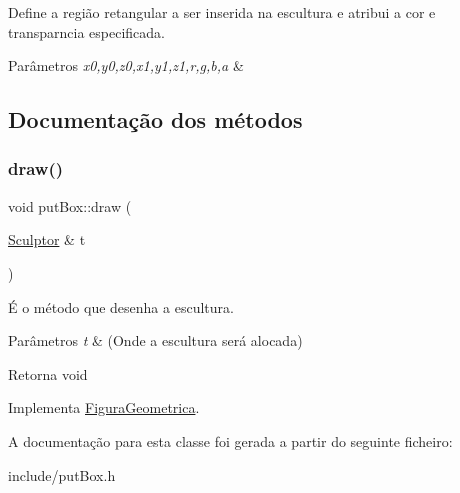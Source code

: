 Define a região retangular a ser inserida na escultura e atribui a cor e transparncia especificada. 


\begin{DoxyParams}{Parâmetros}
{\em x0,y0,z0,x1,y1,z1,r,g,b,a} & \\
\hline
\end{DoxyParams}


\subsection{Documentação dos métodos}
\mbox{\label{classput_box_afd85072811169fc9f25435de046a101e}} 
\subsubsection{\texorpdfstring{draw()}{draw()}}
{\footnotesize\ttfamily void put\+Box\+::draw (\begin{DoxyParamCaption}\item[{\hyperlink{class_sculptor}{Sculptor} \&}]{t }\end{DoxyParamCaption})\hspace{0.3cm}{\ttfamily [virtual]}}



É o método que desenha a escultura. 


\begin{DoxyParams}{Parâmetros}
{\em t} & (Onde a escultura será alocada) \\
\hline
\end{DoxyParams}
\begin{DoxyReturn}{Retorna}
void 
\end{DoxyReturn}


Implementa \hyperlink{class_figura_geometrica_a34585fd7c0bd7378fc69c4ee208e676c}{Figura\+Geometrica}.



A documentação para esta classe foi gerada a partir do seguinte ficheiro\+:\begin{DoxyCompactItemize}
\item 
include/put\+Box.\+h\end{DoxyCompactItemize}
